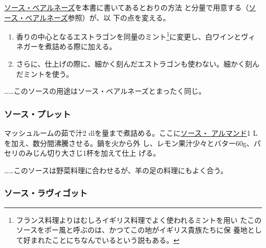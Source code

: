 \begin{recette}
\protect\hyperlink{sauce-bearnaise}{ソース・ベアルネーズ}を本書に書いてあるとおりの方法
と分量で用意する（\protect\hyperlink{sauce-bearnaise}{ソース・ベアルネーズ}参照）が、以
下の点を変える。

\begin{enumerate}
\def\labelenumi{\arabic{enumi}.}
\item
  香りの中心となるエストラゴンを同量のミント\footnote{フランス料理よりはむしろイギリス料理でよく使われるミントを用い
    たこのソースをポー風と呼ぶのは、かつてこの地がイギリス貴族たちに保
    養地として好まれたことにちなんでいるという説もある。}に変更し、白ワインとヴィネガーを煮詰める際に加える。
\item
  さらに、仕上げの際に、細かく刻んだエストラゴンも使わない。細かく刻んだミントを使う。
\end{enumerate}

\ldots{}\ldots{}このソースの用途はソース・ベアルネーズとまったく同じ。

\maeaki

\hypertarget{sauce-poulette}{%
\subsubsection{ソース・プレット}\label{sauce-poulette}}



マッシュルームの茹で汁2
dlを\untiers{}量まで煮詰める。ここに\protect\hyperlink{sauce-allemande}{ソース・
アルマンド}1 Lを加え、数分間沸騰させる。鍋を火から外
し、レモン果汁少々とバター60g、パセリのみじん切り大さじ1杯を加えて仕上
げる。

\ldots{}\ldots{}このソースは野菜料理に合わせるが、羊の足の料理にもよく合う。

\maeaki

\hypertarget{sauce-ravigote}{%
\subsubsection{ソース・ラヴィゴット}\label{sauce-ravigote}}


\end{recette}
